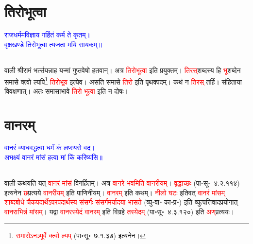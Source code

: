 \section[तिरोभूत्वा]{तिरोभूत्वा}
\centering\textcolor{blue}{राजधर्ममविज्ञाय गर्हितं कर्म ते कृतम्।\nopagebreak\\
वृक्षखण्डे तिरोभूत्वा त्यजता मयि सायकम्॥}\nopagebreak\\
\\
\begin{sloppypar}\justifying\noindent\hspace{10mm} वाली श्रीरामं भर्त्सयन्नाह यन्मां गुप्तवेषो हतवान्। अत्र \textcolor{red}{तिरोभूत्वा} इति प्रयुक्तम्। \textcolor{red}{तिरस्‌}\-शब्दस्य हि \textcolor{red}{भू}\-शब्देन समासे क्त्वो ल्यपि\footnote{\textcolor{red}{समासेऽनञ्पूर्वे क्त्वो ल्यप्‌} (पा॰सू॰~७.१.३७) इत्यनेन।} \textcolor{red}{तिरोभूय} इत्येव। असति समासे \textcolor{red}{तिरो} इति पृथक्पदम्। कथं न \textcolor{red}{तिरस्} तर्हि। संहिताया विवक्षणात्। अतः समासाभावे \textcolor{red}{तिरो भूत्वा} इति न दोषः।\end{sloppypar}
\section[वानरम्]{वानरम्}
\centering\textcolor{blue}{ वानरं व्याधवद्धत्वा धर्मं कं लप्स्यसे वद।\nopagebreak\\
अभक्ष्यं वानरं मांसं हत्वा मां किं करिष्यसि॥}\nopagebreak\\
\\
\begin{sloppypar}\justifying\noindent\hspace{10mm} वाली कथयति यत् \textcolor{red}{वानरं मांसं} विगर्हितम्। अत्र \textcolor{red}{वानरे भवमिति वानरीयम्}। \textcolor{red}{वृद्धाच्छः} (पा॰सू॰~४.२.११४) इत्यनेन \textcolor{red}{छ}\-प्रत्यये \textcolor{red}{वानरीयम्} इति पाणिनीयम्। \textcolor{red}{वानरम्} इति कथम्। \textcolor{red}{नीलो घटः} इतिवत् \textcolor{red}{वानरं मांसम्}। \textcolor{red}{शाब्द\-बोधे चैक\-पदार्थेऽपर\-पदार्थस्य संसर्गः संसर्ग\-मर्यादया भासते} (व्यु॰वा॰ का॰प्र॰) इति व्युत्पत्ति\-वाद\-प्रयोगात् \textcolor{red}{वानराभिन्नं मांसम्}। यद्वा \textcolor{red}{वानरस्येदं वानरम्} इति विग्रहे \textcolor{red}{तस्येदम्} (पा॰सू॰~४.३.१२०) इति \textcolor{red}{अण्‌}\-प्रत्ययः।\end{sloppypar}
